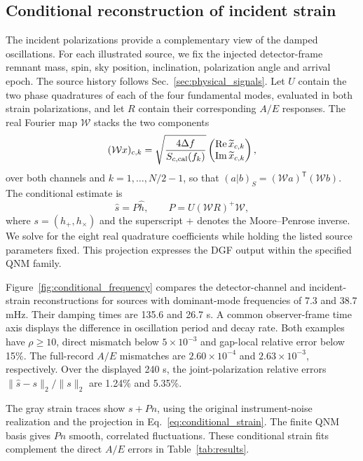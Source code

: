 \documentclass[10pt,prd,aps,a4paper,twocolumn,superscriptaddress,nofootinbib,floatfix]{revtex4-2}
\begin{document}
\subsection{Conditional reconstruction of incident strain}\label{subsec:incident_strain}
The incident polarizations provide a complementary view of the damped oscillations. For each illustrated source, we fix the injected detector-frame remnant mass, spin, sky position, inclination, polarization angle and arrival epoch. The source history follows Sec.~\ref{sec:physical_signals}. Let $U$ contain the two phase quadratures of each of the four fundamental modes, evaluated in both strain polarizations, and let $R$ contain their corresponding $A/E$ responses. The real Fourier map $\mathcal W$ stacks the two components
\begin{equation}
(\mathcal W x)_{c,k}=\sqrt{\frac{4\Delta f}{S_{c,\rm cal}(f_k)}}
\begin{pmatrix}\operatorname{Re}\widetilde x_{c,k}\\\operatorname{Im}\widetilde x_{c,k}\end{pmatrix},
\end{equation}
over both channels and $k=1,\ldots,N/2-1$, so that $(a|b)_S=(\mathcal W a)^{\mathsf T}(\mathcal W b)$. The conditional estimate is
\begin{equation}
\widehat s=P\widehat h,\qquad P=U(\mathcal W R)^+\mathcal W,\label{eq:conditional_strain}
\end{equation}
where $s=(h_+,h_\times)$ and the superscript $+$ denotes the Moore--Penrose inverse. We solve for the eight real quadrature coefficients while holding the listed source parameters fixed. This projection expresses the DGF output within the specified QNM family.

Figure~\ref{fig:conditional_frequency} compares the detector-channel and incident-strain reconstructions for sources with dominant-mode frequencies of 7.3 and 38.7 mHz. Their damping times are 135.6 and 26.7 s. A common observer-frame time axis displays the difference in oscillation period and decay rate. Both examples have $\rho\ge10$, direct mismatch below $5\times10^{-3}$ and gap-local relative error below 15\%. The full-record $A/E$ mismatches are $2.60\times10^{-4}$ and $2.63\times10^{-3}$, respectively. Over the displayed 240 s, the joint-polarization relative errors $\|\widehat s-s\|_2/\|s\|_2$ are 1.24\% and 5.35\%.

The gray strain traces show $s+Pn$, using the original instrument-noise realization and the projection in Eq.~\eqref{eq:conditional_strain}. The finite QNM basis gives $Pn$ smooth, correlated fluctuations. These conditional strain fits complement the direct $A/E$ errors in Table~\ref{tab:results}.
\end{document}
